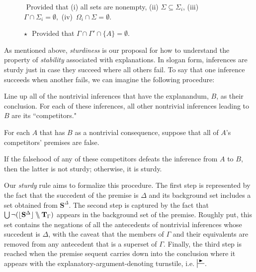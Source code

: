 \documentclass{article}
\theoremstyle{definition}
\theoremstyle{definition}
\theoremstyle{definition}
\theoremstyle{definition}
\theoremstyle{remark}
\theoremstyle{definition}
\theoremstyle{definition}
\begin{document}
\begin{figure}[!ht]
	\vspace{.75cm}
	
	\ddag \,\,Provided that (i) all sets are nonempty, (ii) $\Sigma \subseteq \Sigma_i $, (iii) $\Gamma\cap\Sigma_i  = \emptyset, $ (iv) $\, \Omega_i \cap \Sigma = \emptyset$.
	
	\vspace{.3cm}
	
	$ \star $ \,\,Provided that  $ \Gamma\cap\Gamma'\cap\{A\}  = \emptyset. $
	
\end{figure}


As mentioned above, \textit{sturdiness} is our proposal for how to understand the property of \textit{stability} associated with explanations. In slogan form, inferences are sturdy just in case they succeed where all others fail. To say that one inference succeeds when another fails, we can imagine the following procedure:
\begin{description}
	\setlength\itemsep{.2cm}
	\item[Step 1:]   Line up all of the nontrivial inferences that have the explanandum, $B$, as their conclusion. For each of these inferences, all other nontrivial inferences leading to $B$ are its ``competitors."
	
	\item[Step 2:] For each $A$ that has $B$ as a nontrivial consequence, suppose that all of $A$'s competitors' premises are false.
	
	\item[Step 3:] If the falsehood of any of these competitors defeats the inference from $A$ to $B$, then the latter is not sturdy; otherwise, it is sturdy.
\end{description}

Our \textit{sturdy} rule aims to formalize this procedure. The first step is represented by the fact that the succedent of the premise is $ \Delta $ and its background set includes a set obtained from $\mathbf{S}^\Delta $. The second step is captured by the fact that $ \bigcup\neg(\lfloor \mathbf{S}^\Delta \rfloor\bbslash \mathbf{T}_{\Gamma} )$ appears in the background set of the premise. Roughly put, this set contains the negations of all the antecedents of nontrivial inferences whose succedent is $ \Delta $, with the caveat that the members of $ \Gamma $ and their equivalents are removed from any antecedent that is a superset of $ \Gamma $. Finally, the third step is reached when the premise sequent carries down into the conclusion where it appears with the explanatory-argument-denoting turnstile, i.e. $ \sststile{}{\RHD} $. 
\end{document}

